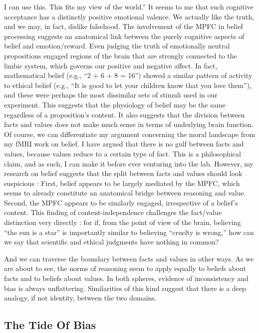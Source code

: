 \documentclass[a4paper,14pt]{extbook}
\begin{document}
I can use this.
This fits my view of the world.''
It seems to me that such cognitive acceptance has a distinctly positive emotional valence.
We actually like the truth, and we may, in fact, dislike falsehood.
The involvement of the MPFC in belief processing suggests an anatomical link between the purely cognitive aspects of belief and emotion/reward.
Even judging the truth of emotionally neutral propositions engaged regions of the brain that are strongly connected to the limbic system, which governs our positive and negative affect.
In fact, mathematical belief (e.g., ``2 + 6 + 8 = 16'') showed a similar pattern of activity to ethical belief (e.g., ``It is good to let your children know that you love them''), and these were perhaps the most dissimilar sets of stimuli used in our experiment.
This suggests that the physiology of belief may be the same regardless of a proposition’s content.
It also suggests that the division between facts and values does not make much sense in terms of underlying brain function.
Of course, we can differentiate my argument concerning the moral landscape from my fMRI work on belief.
I have argued that there is no gulf between facts and values, because values reduce to a certain type of fact.
This is a philosophical claim, and as such, I can make it before ever venturing into the lab.
However, my research on belief suggests that the split between facts and values should look suspicious :
First, belief appears to be largely mediated by the MPFC, which seems to already constitute an anatomical bridge between reasoning and value.
Second, the MPFC appears to be similarly engaged, irrespective of a belief’s content.
This finding of content-independence challenges the fact/value distinction very directly :
for if, from the point of view of the brain, believing ``the sun is a star'' is importantly similar to believing ``cruelty is wrong,'' how can we say that scientific and ethical judgments have nothing in common?

And we can traverse the boundary between facts and values in other ways.
As we are about to see, the norms of reasoning seem to apply equally to beliefs about facts and to beliefs about values.
In both spheres, evidence of inconsistency and bias is always unflattering.
Similarities of this kind suggest that there is a deep analogy, if not identity, between the two domains.

\subsection{The Tide Of Bias}
\end{document}
